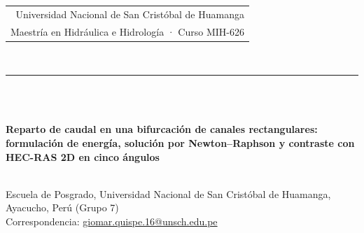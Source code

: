 \thispagestyle{firstpage}
\noindent{}\hfill{\footnotesize\color{wgrey}\begin{tabular}{r}Universidad Nacional de San Cristóbal de Huamanga\\Maestría en Hidráulica e Hidrología · Curso MIH-626\end{tabular}}\\[-2pt]
{\color{wgrey}\rule{\textwidth}{0.5pt}}\\[8pt]
\\[10pt]
{\raggedright\fontsize{17}{20}\selectfont\bfseries Reparto de caudal en una bifurcación de canales rectangulares: formulación de energía, solución por Newton--Raphson y contraste con HEC-RAS 2D en cinco ángulos\par}
\vspace{10pt}
\\[5pt]
{\small Escuela de Posgrado, Universidad Nacional de San Cristóbal de Huamanga, Ayacucho, Perú (Grupo 7)\\
Correspondencia: \href{mailto:giomar.quispe.16@unsch.edu.pe}{giomar.quispe.16@unsch.edu.pe}}
\vspace{10pt}

